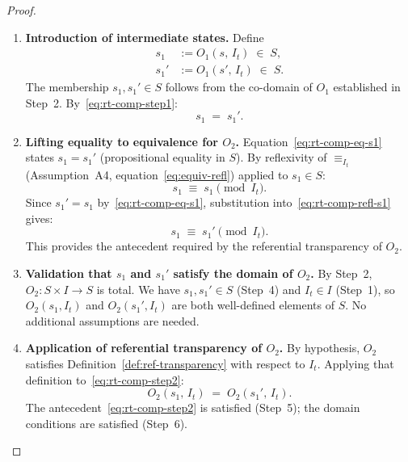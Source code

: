 \documentclass[12pt,openany]{book}
\newcommand{\calI}{\mathcal{I}}
\numberwithin{equation}{chapter}
\theoremstyle{plain}
\theoremstyle{definition}
\theoremstyle{remark}
\numberwithin{equation}{chapter}
\theoremstyle{plain}
\newcommand{\calS}{\mathcal{S}}
\def\calI{I}%
\def\calS{S}%
\begin{document}
\begin{proof}
\begin{enumerate}
  \item \textbf{Introduction of intermediate states.}
        Define
        \begin{align}
          s_1  &:= O_1(s,\, \calI_t)  \;\in\; \calS,
          \label{eq:rt-comp-s1}\\
          s_1' &:= O_1(s',\, \calI_t) \;\in\; \calS.
          \label{eq:rt-comp-s1p}
        \end{align}
        The membership $s_1, s_1' \in \calS$ follows from the
        co-domain of $O_1$ established in Step~2.
        By~\eqref{eq:rt-comp-step1}:
        \begin{equation}
          s_1 \;=\; s_1'.
          \label{eq:rt-comp-eq-s1}
        \end{equation}

  \item \textbf{Lifting equality to equivalence for $O_2$.}
        Equation~\eqref{eq:rt-comp-eq-s1} states $s_1 = s_1'$
        (propositional equality in $\calS$).  By reflexivity of
        $\equiv_{\calI_t}$ (Assumption~A4,
        equation~\eqref{eq:equiv-refl}) applied to $s_1 \in \calS$:
        \begin{equation}
          s_1 \;\equiv\; s_1 \pmod{\calI_t}.
          \label{eq:rt-comp-refl-s1}
        \end{equation}
        Since $s_1' = s_1$ by~\eqref{eq:rt-comp-eq-s1}, substitution
        into~\eqref{eq:rt-comp-refl-s1} gives:
        \begin{equation}
          s_1 \;\equiv\; s_1' \pmod{\calI_t}.
          \label{eq:rt-comp-step2}
        \end{equation}
        This provides the antecedent required by the referential
        transparency of $O_2$.

  \item \textbf{Validation that $s_1$ and $s_1'$ satisfy the
        domain of $O_2$.}
        By Step~2, $O_2 : \calS \times \calI \to \calS$ is total.
        We have $s_1, s_1' \in \calS$ (Step~4) and
        $\calI_t \in \calI$ (Step~1), so $O_2(s_1, \calI_t)$ and
        $O_2(s_1', \calI_t)$ are both well-defined elements of
        $\calS$.  No additional assumptions are needed.

  \item \textbf{Application of referential transparency of $O_2$.}
        By hypothesis, $O_2$ satisfies
        Definition~\ref{def:ref-transparency} with respect to
        $\calI_t$.  Applying that definition to~\eqref{eq:rt-comp-step2}:
        \begin{equation}
          O_2(s_1,\, \calI_t)
          \;=\;
          O_2(s_1',\, \calI_t).
          \label{eq:rt-comp-step3}
        \end{equation}
        The antecedent~\eqref{eq:rt-comp-step2} is satisfied (Step~5);
        the domain conditions are satisfied (Step~6).


\end{enumerate}
\end{proof}
\end{document}
